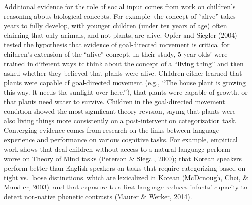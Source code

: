 \documentclass[english,floatsintext,man]{apa6}
\theoremstyle{definition}
\theoremstyle{definition}
\theoremstyle{definition}
\theoremstyle{remark}
\begin{document}
Additional evidence for the role of social input comes from work on
children's reasoning about biological concepts. For example, the concept
of \enquote{alive} takes years to fully develop, with younger children
(under ten years of age) often claiming that only animals, and not
plants, are alive. Opfer and Siegler (2004) tested the hypothesis that
evidence of goal-directed movement is critical for children's extension
of the \enquote{alive} concept. In their study, 5-year-olds' were
trained in different ways to think about the concept of a
\enquote{living thing} and then asked whether they believed that plants
were alive. Children either learned that plants were capable of
goal-directed movement (e.g., \enquote{The house plant is growing this
way. It needs the sunlight over here.}), that plants were capable of
growth, or that plants need water to survive. Children in the
goal-directed movement condition showed the most significant theory
revision, saying that plants were also living things more consistently
on a post-intervention categorization task. Converging evidence comes
from research on the links between language experience and performance
on various cognitive tasks. For example, empirical work shows that deaf
children without access to a natural language perform worse on Theory of
Mind tasks (Peterson \& Siegal, 2000); that Korean speakers perform
better than English speakers on tasks that require categorizing based on
tight vs.~loose distinctions, which are lexicalized in Korean
(McDonough, Choi, \& Mandler, 2003); and that exposure to a first
language reduces infants' capacity to detect non-native phonetic
contrasts (Maurer \& Werker, 2014).
\end{document}
